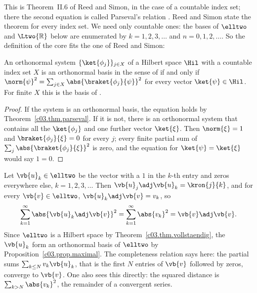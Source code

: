 \begin{vertiefung}
  This is Theorem~II.6 of Reed and Simon, in the case of a countable index set; there the
  second equation is called Parseval's relation . Reed and
  Simon state the theorem for every index set. We need only countable ones: the bases of
  $\elltwo$ and $\Ltwo{\mathbb{R}}$ below are enumerated by $k = 1, 2, 3, \dots$ and
  $n = 0, 1, 2, \dots$. So the definition of the core fits the one of Reed and Simon:

  \begin{proposition}\label{c03.prop.maximal}
    An orthonormal system $\{\ket{\phi_j}\}_{j \in X}$ of a Hilbert space $\Hil$ with a
    countable index set $X$ is an orthonormal basis in the sense of  if and only if
    $\norm{\psi}^2 = \sum_{j \in X} \abs{\braket{\phi_j}{\psi}}^2$ for every vector
    $\ket{\psi} \in \Hil$. For finite $X$ this is the basis of .
  \end{proposition}
  \begin{proof}
    If the system is an orthonormal basis, the equation holds by
    Theorem~\ref{c03.thm.parseval}. If it is not, there is an orthonormal system that contains
    all the $\ket{\phi_j}$ and one further vector $\ket{\xi}$. Then $\norm{\xi} = 1$ and
    $\braket{\phi_j}{\xi} = 0$ for every $j$; every finite partial sum of
    $\sum_j \abs{\braket{\phi_j}{\xi}}^2$ is zero, and the equation for $\ket{\psi} = \ket{\xi}$
    would say $1 = 0$.
  \end{proof}

  \begin{example}\label{c03.ex.elltwo-basis}
    Let $\vb{u}_k \in \elltwo$ be the vector with a $1$ in the $k$-th entry and zeros everywhere
    else, $k = 1, 2, 3, \dots$ Then $\vb{u}_j\adj\vb{u}_k = \kron{j}{k}$, and for every
    $\vb{v} \in \elltwo$, $\vb{u}_k\adj\vb{v} = v_k$, so
    \begin{equation}\label{c03.eq.elltwo-basis}
      \sum_{k=1}^{\infty} \abs{\vb{u}_k\adj\vb{v}}^2 = \sum_{k=1}^{\infty} \abs{v_k}^2 = \vb{v}\adj\vb{v} .
    \end{equation}
    Since $\elltwo$ is a Hilbert space by Theorem~\ref{c03.thm.vollstaendig}, the $\vb{u}_k$
    form an orthonormal basis of $\elltwo$ by Proposition~\ref{c03.prop.maximal}. The
    completeness relation says here: the partial sums $\sum_{k \leq N} v_k \vb{u}_k$, that is
    the first $N$ entries of $\vb{v}$ followed by zeros, converge to $\vb{v}$. One also sees this
    directly: the squared distance is $\sum_{k > N} \abs{v_k}^2$, the remainder of a convergent
    series.
  \end{example}


\end{vertiefung}
